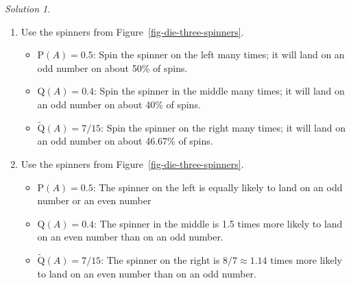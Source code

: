 \documentclass[
  letterpaper,
  DIV=11,
  numbers=noendperiod]{scrreprt}
\providecommand{\tightlist}{%
  \setlength{\itemsep}{0pt}\setlength{\parskip}{0pt}}
\theoremstyle{plain}
\theoremstyle{definition}
\theoremstyle{definition}
\theoremstyle{definition}
\theoremstyle{remark}
\newtheorem{refsolution}{Solution}[chapter]
\begin{document}
\begin{tcolorbox}[enhanced jigsaw, opacityback=0, rightrule=.15mm, coltitle=black, colframe=quarto-callout-tip-color-frame, toprule=.15mm, colbacktitle=quarto-callout-tip-color!10!white, opacitybacktitle=0.6, left=2mm, toptitle=1mm, breakable, title={Solution (click to expand)}, bottomtitle=1mm, colback=white, leftrule=.75mm, titlerule=0mm, arc=.35mm, bottomrule=.15mm]

\begin{refsolution}
\leavevmode

\begin{enumerate}
\def\labelenumi{\arabic{enumi}.}
\tightlist
\item
  Use the spinners from Figure~\ref{fig-die-three-spinners}.

  \begin{itemize}
  \tightlist
  \item
    \(\textrm{P}(A) = 0.5\): Spin the spinner on the left many times; it
    will land on an odd number on about 50\% of spins.
  \item
    \(\textrm{Q}(A) = 0.4\): Spin the spinner in the middle many times;
    it will land on an odd number on about 40\% of spins.
  \item
    \(\tilde{\textrm{Q}}(A) = 7/15\): Spin the spinner on the right many
    times; it will land on an odd number on about 46.67\% of spins.
  \end{itemize}
\item
  Use the spinners from Figure~\ref{fig-die-three-spinners}.

  \begin{itemize}
  \tightlist
  \item
    \(\textrm{P}(A) = 0.5\): The spinner on the left is equally likely
    to land on an odd number or an even number
  \item
    \(\textrm{Q}(A) = 0.4\): The spinner in the middle is 1.5 times more
    likely to land on an even number than on an odd number.
  \item
    \(\tilde{\textrm{Q}}(A) = 7/15\): The spinner on the right is
    \(8/7\approx 1.14\) times more likely to land on an even number than
    on an odd number.
  \end{itemize}
\end{enumerate}

\label{sol-dice-measures-interpret}

\end{refsolution}

\end{tcolorbox}
\end{document}
